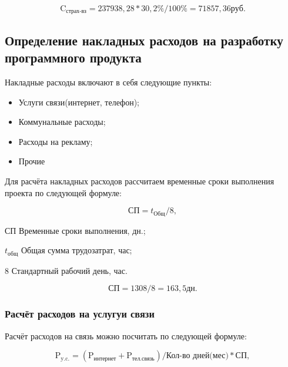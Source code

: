 \begin{equation*}
    \text{C}_\text{страх-вз} = 237938,28 * 30,2\% / 100\% = 71857,36 руб.
\end{equation*}

\tocless\subsection{Определение накладных расходов на разработку программного продукта}

Накладные расходы включают в себя следующие пункты:

\begin{itemize}
    \item Услуги связи(интернет, телефон);
    \item Коммунальные расходы;
    \item Расходы на рекламу;
    \item Прочие
\end{itemize}

Для расчёта накладных расходов рассчитаем временные сроки выполнения проекта по следующей
формуле:

\begin{equation}
    \text{СП} = t_\text{Общ} / 8,
\end{equation}

\begin{eqexpl}[5ex]
    \item{СП} Временные сроки выполнения, дн.;
    \item{$t_\text{общ}$} Общая сумма трудозатрат, час;
    \item{8} Стандартный рабочий день, час.
\end{eqexpl}

\begin{equation*}
    \text{СП} = 1308 / 8 = 163,5 дн.
\end{equation*}

\subsubsection{Расчёт расходов на услугуи связи}

Расчёт расходов на связь можно посчитать по следующей формуле:

\begin{equation}
    \text{P}_\text{y.c.} = (\text{P}_\text{интернет} + \text{P}_\text{тел.связь}) / \text{Кол-во дней(мес)} * \text{СП},
\end{equation}

